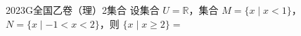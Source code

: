 
\begin{problem}{2023}{G}{全国乙卷（理）}{2}{集合}
设集合 $ U = \mathbb{R} $，集合 $ M = \{x \mid x < 1\} $，$ N = \{x \mid -1 < x < 2\} $，则 $ \{x \mid x \geqslant 2\} = $
\begin{choices}
\end{choices}
\end{problem}

\begin{answer}

\end{answer}

\begin{solutions}

\end{solutions}